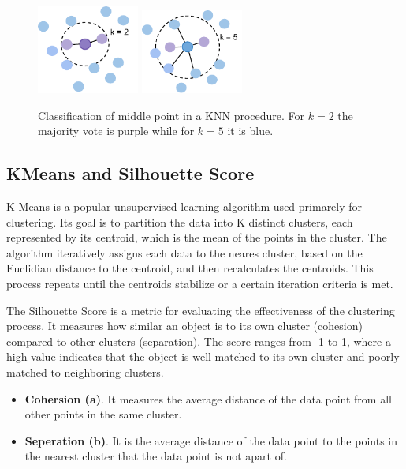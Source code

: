 \begin{figure}[H]
    \centering
    \includegraphics[width=0.3\textwidth]{figures/figure-pdf/2NN.pdf}
    \hspace{1cm}
    \includegraphics[width=0.3\textwidth]{figures/figure-pdf/5NN.pdf}
    \caption{Classification of middle point in a KNN procedure. For $k=2$ the majority vote is purple while for $k=5$ it is blue.}
    \label{fig:knn}
\end{figure}

\subsection{KMeans and Silhouette Score}
K-Means is a popular unsupervised learning algorithm used primarely for clustering.
Its goal is to partition the data into K distinct clusters, each represented by its centroid, which is the mean of the points in the cluster.
The algorithm iteratively assigns each data to the neares cluster, based on the Euclidian distance to the centroid, and then recalculates the centroids. 
This process repeats until the centroids stabilize or a certain iteration criteria is met. 

The Silhouette Score is a metric for evaluating the effectiveness of the clustering process. It measures how similar an object is to its own cluster (cohesion) compared to other clusters (separation).
The score ranges from -1 to 1, where a high value indicates that the object is well matched to its own cluster and poorly matched to neighboring clusters.

\begin{itemize}
    \item \textbf{Cohersion (a)}. It measures the average distance of the data point from all other points in the same cluster. \\
    \item \textbf{Seperation (b)}. It is the average distance of the data point to the points in the nearest cluster that the data point is not apart of.
\end{itemize}

